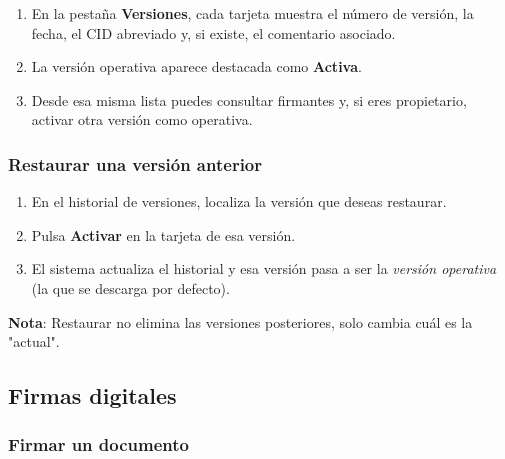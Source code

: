 \documentclass[11pt, a4paper]{article}
\begin{document}
\begin{enumerate}
    \item En la pestaña \textbf{Versiones}, cada tarjeta muestra el número de versión, la fecha, el CID abreviado y, si existe, el comentario asociado.
    \item La versión operativa aparece destacada como \textbf{Activa}.
    \item Desde esa misma lista puedes consultar firmantes y, si eres propietario, activar otra versión como operativa.
\end{enumerate}

\subsubsection{Restaurar una versión anterior}

\begin{enumerate}
    \item En el historial de versiones, localiza la versión que deseas restaurar.
    \item Pulsa \textbf{Activar} en la tarjeta de esa versión.
    \item El sistema actualiza el historial y esa versión pasa a ser la \textit{versión operativa} (la que se descarga por defecto).
\end{enumerate}

\textbf{Nota}: Restaurar no elimina las versiones posteriores, solo cambia cuál es la "actual".

\subsection{Firmas digitales}

\subsubsection{Firmar un documento}
\end{document}
